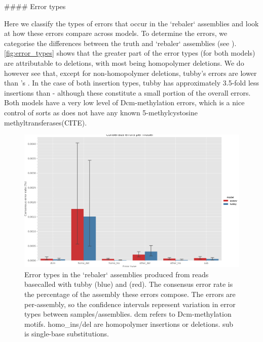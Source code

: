 \begin{markdown}

#### Error types

Here we classify the types of errors that occur in the `rebaler` assemblies and look at how these errors compare across models. To determine the errors, we categorise the differences between the truth and `rebaler` assemblies (see ). \autoref{fig:error_types} shows that the greater part of the error types (for both models) are attributable to deletions, with most being homopolymer deletions. We do however see that, except for non-homopolymer deletions, tubby's errors are lower than \guppy{}'s . In the case of both insertion types, tubby has approximately 3.5-fold less insertions than \guppy{} - although these constitute a small portion of the overall errors. Both models have a very low level of Dcm-methylation errors, which is a nice control of sorts as \mtb{} does not have any known 5-methylcystosine methyltransferases(CITE).

\end{markdown}

\begin{figure}
\includegraphics[width=1.0\textwidth]{Chapter2/Figs/consensus-error-types.png}
\centering
\caption{Error types in the `rebaler` assemblies produced from reads basecalled with tubby (blue) and \guppy{} (red). The consensus error rate is the percentage of the assembly these errors compose. The errors are per-assembly, so the confidence intervals represent variation in error types between samples/assemblies. dcm refers to Dcm-methylation motifs. homo\_ins/del are homopolymer insertions or deletions. sub is single-base substitutions.}
\label{fig:error_types}
\end{figure}

